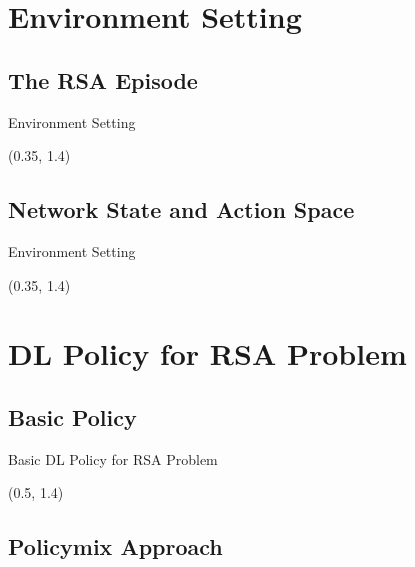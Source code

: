 \documentclass[english,aspectratio=169,dvipsnames]{beamer}
\begin{document}
\section{Environment Setting}

\subsection{The RSA Episode}

\begin{frame}{Environment Setting}{}
	\begin{textblock}{5}(0.35, 1.4)
        
    \end{textblock}
\end{frame}


\subsection{Network State and Action Space}

\begin{frame}{Environment Setting}{}
	\begin{textblock}{5}(0.35, 1.4)
        
    \end{textblock}
\end{frame}


\section{DL Policy for RSA Problem}

\subsection{Basic Policy}

\begin{frame}{Basic DL Policy for RSA Problem}
	\begin{textblock}{5}(0.5, 1.4)
        
    \end{textblock}
\end{frame}


\subsection{Policymix Approach}
\end{document}
